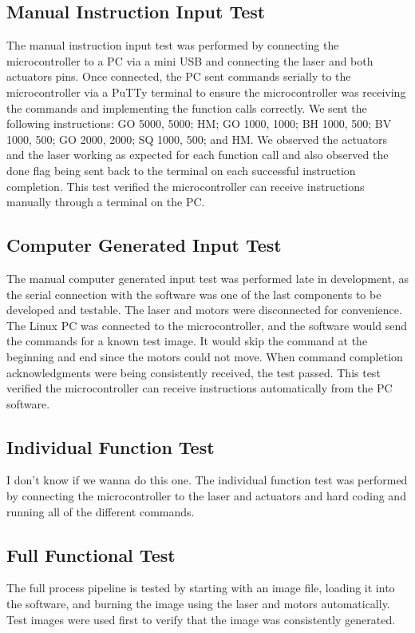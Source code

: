 \documentclass[11pt]{LaTeX-Classes/math-hw}
\begin{document}
\subsection{Manual Instruction Input Test}
The manual instruction input test was performed by connecting the microcontroller to a PC via a mini USB and connecting the laser and both actuators pins. Once connected, the PC sent commands serially to the microcontroller via a PuTTy terminal to ensure the microcontroller was receiving the commands and implementing the function calls correctly. We sent the following instructions: GO 5000, 5000; HM; GO 1000, 1000; BH 1000, 500; BV 1000, 500; GO 2000, 2000; SQ 1000, 500; and HM. We observed the actuators and the laser working as expected for each function call and also observed the done flag being sent back to the terminal on each successful instruction completion. This test verified the microcontroller can receive instructions manually through a terminal on the PC.

\subsection{Computer Generated Input Test}
The manual computer generated input test was performed late in development, as the serial connection
with the software was one of the last components to be developed and testable.
The laser and motors were disconnected for convenience.
The Linux PC was connected to the microcontroller, and the software would send the commands for
a known test image. It would skip the  command at the beginning and end since the motors
could not move.
When command completion acknowledgments were being consistently received, the test passed.
This test verified the microcontroller can receive instructions automatically from the PC software.

\subsection{Individual Function Test} I don't know if we wanna do this one.
The individual function test was performed by connecting the microcontroller to the laser and actuators and hard coding and running all of the different commands.  

\subsection{Full Functional Test}
The full process pipeline is tested by starting with an image file, loading it into the software,
and burning the image using the laser and motors automatically.
Test images were used first to verify that the image was consistently generated.
\end{document}
